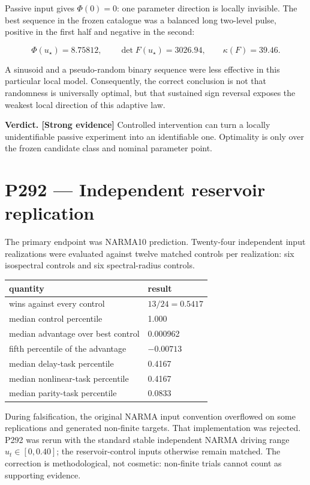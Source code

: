 \documentclass[11pt,a4paper,openany]{report}
\newcommand{\statusStrong}{\textcolor{finblue}{[Strong evidence]}}
\begin{document}
Passive input gives \(\Phi(0)=0\): one parameter direction is locally invisible. The best sequence in the frozen catalogue was a balanced long two-level pulse, positive in the first half and negative in the second:

\[
\Phi(u_\star)=8.75812,\qquad
\det F(u_\star)=3026.94,\qquad
\kappa(F)=39.46.
\]

A sinusoid and a pseudo-random binary sequence were less effective in this particular local model. Consequently, the correct conclusion is not that randomness is universally optimal, but that sustained sign reversal exposes the weakest local direction of this adaptive law.

\textbf{Verdict. \statusStrong{}} Controlled intervention can turn a locally unidentifiable passive experiment into an identifiable one. Optimality is only over the frozen candidate class and nominal parameter point.

\chapter{P292 --- Independent reservoir replication}

The primary endpoint was NARMA10 prediction. Twenty-four independent input realizations were evaluated against twelve matched controls per realization: six isospectral controls and six spectral-radius controls.

\begin{center}
\begingroup\small
\setlength{\tabcolsep}{2.5pt}
\renewcommand{\arraystretch}{1.16}
\begin{longtable}{@{}p{}p{}@{}}
\toprule
\textbf{quantity} & \textbf{result} \\
\midrule
\endhead
wins against every control & \(13/24=0.5417\) \\
median control percentile & 1.000 \\
median advantage over best control & 0.000962 \\
fifth percentile of the advantage & \(-0.00713\) \\
median delay-task percentile & 0.4167 \\
median nonlinear-task percentile & 0.4167 \\
median parity-task percentile & 0.0833 \\
\bottomrule
\end{longtable}
\endgroup
\end{center}

During falsification, the original NARMA input convention overflowed on some replications and generated non-finite targets. That implementation was rejected. P292 was rerun with the standard stable independent NARMA driving range \(u_t\in[0,0.40]\); the reservoir-control inputs otherwise remain matched. The correction is methodological, not cosmetic: non-finite trials cannot count as supporting evidence.
\end{document}
